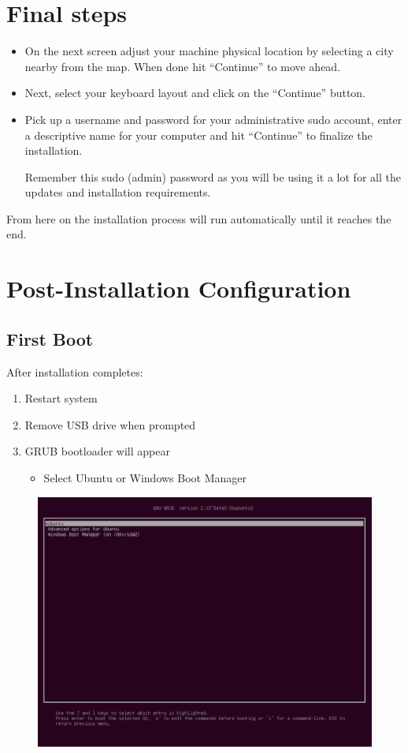 \documentclass[11pt,a4paper]{article}
\newenvironment{note}
{\begin{tcolorbox}[colback=notecolor!10,colframe=notecolor,title=\textbf{Note}]}
{\end{tcolorbox}}
\begin{document}
\section{Final steps}
\begin{itemize}
    \item On the next screen adjust your machine physical location
    by selecting a city nearby from the map. When done hit
    ``Continue'' to move ahead.
    \item Next, select your keyboard layout and click on the
``Continue'' button.
    \item Pick up a username and password for your administrative
sudo account, enter a descriptive name for your computer
and hit ``Continue'' to finalize the installation.
\begin{note}
    Remember this sudo (admin) password as you will be using it a lot for all the updates and installation requirements.
    \end{note}
\end{itemize}
From here on the installation process will run automatically until it reaches the end.
\section{Post-Installation Configuration}
\subsection{First Boot}
After installation completes:
\begin{enumerate}
    \item Restart system
    \item Remove USB drive when prompted
    \item GRUB bootloader will appear
    \begin{itemize}
        \item Select Ubuntu or Windows Boot Manager
    \end{itemize}
\end{enumerate}
\begin{figure}[htp]
        \centering
        \includegraphics[width=0.6\linewidth]{images/step10.png}
        \label{fig:enter-label}
    \end{figure}
\end{document}
